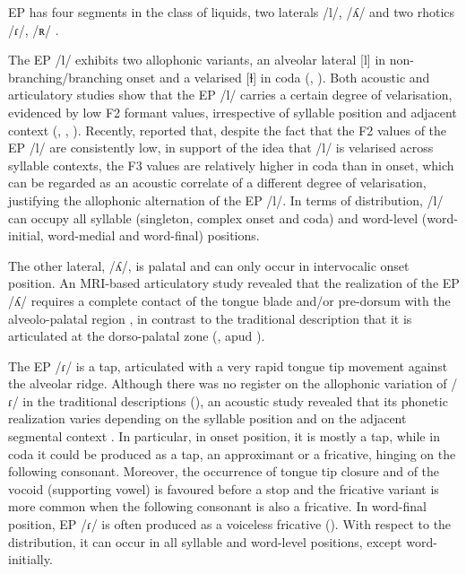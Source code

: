 \documentclass[output=paper]{../langscibook}
\begin{document}
EP has four segments in the class of liquids, two laterals /l/, /ʎ/ and two rhotics /ɾ/, /ʀ/ \citep{MateusEtAl2016}.

The EP /l/ exhibits two allophonic variants, an alveolar lateral [l] in non-bran\-ching\slash branching onset and a velarised [ɫ] in coda (\citealt{MateusAndrade2000}, \citealt{MateusEtAl2016}). Both acoustic and articulatory studies show that the EP /l/ carries a certain degree of velarisation, evidenced by low F2 formant values, irrespective of syllable position and adjacent context (\citealt{Andrade1998}, \citealt{Marques2010}, \citealt{OliveiraEtAl2011}). Recently, \citet{RodriguesEtAl2019} reported that, despite the fact that the F2 values of the EP /l/ are consistently low, in support of the idea that /l/ is velarised across syllable contexts, the F3 values are relatively higher in coda than in onset, which can be regarded as an acoustic correlate of a different degree of velarisation, justifying the allophonic alternation of the EP /l/. In terms of distribution, /l/ can occupy all syllable (singleton, complex onset and coda) and word-level (word-initial, word-medial and word-final) positions.

The other lateral, /ʎ/, is palatal and can only occur in intervocalic onset position. An MRI-based articulatory study revealed that the realization of the EP /ʎ/ requires a complete contact of the tongue blade and/or pre-dorsum with the alveolo-palatal region \citep{TeixeiraEtAl2012}, in contrast to the traditional description that it is articulated at the dorso-palatal zone (\citealt{SáNogueira1938}, apud \citealt{MateusAndrade2000}).

The EP /ɾ/ is a tap, articulated with a very rapid tongue tip movement against the alveolar ridge. Although there was no register on the allophonic variation of /ɾ/ in the traditional descriptions (\citealt{MateusAndrade2000}), an acoustic study revealed that its phonetic realization varies depending on the syllable position and on the adjacent segmental context \citep{Silva2014}. In particular, in onset position, it is mostly a tap, while in coda it could be produced as a tap, an approximant or a fricative, hinging on the following consonant. Moreover, the occurrence of tongue tip closure and of the vocoid (supporting vowel) is favoured before a stop and the fricative variant is more common when the following consonant is also a fricative. In word-final position, EP /ɾ/ is often produced as a voiceless fricative (\citealt{JesusShadle2005}). With respect to the distribution, it can occur in all syllable and word-level positions, except word-initially.
\end{document}
